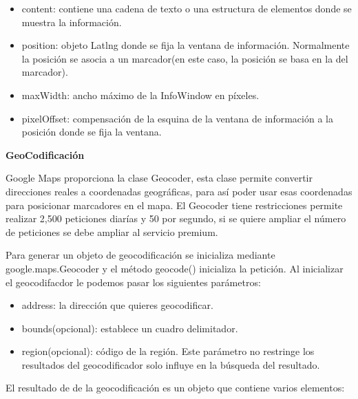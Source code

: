 \begin{itemize}

\item content: contiene una cadena de texto o una estructura de elementos donde se muestra la información.

\item position: objeto Latlng donde se fija la ventana de información. Normalmente la posición se asocia a un marcador(en este caso, la posición se basa en la del marcador).

\item maxWidth: ancho máximo de la InfoWindow en píxeles.

\item pixelOffset: compensación de la esquina de la ventana de información a la posición donde se fija la ventana.

\end{itemize}

\vspace{5 mm}

\textbf{GeoCodificación}

Google Maps proporciona la clase Geocoder, esta clase permite convertir direcciones reales a coordenadas geográficas, para así poder usar esas coordenadas para posicionar marcadores en el mapa. El Geocoder tiene restricciones permite realizar 2,500 peticiones diarías y 50 por segundo, si se quiere ampliar el número de peticiones se debe ampliar al servicio premium.

\vspace{5 mm}

Para generar un objeto de geocodificación se inicializa mediante google.maps.Geocoder y el método geocode() inicializa la petición. Al inicializar el geocodifacdor le podemos pasar los siguientes parámetros:

\begin{itemize}

\item address: la dirección que quieres geocodificar.

\item bounds(opcional): establece un cuadro delimitador. 

\item region(opcional): código de la región. Este parámetro no restringe los resultados del geocodificador solo influye en la búsqueda del resultado.

\end{itemize}

El resultado de de la geocodificación es un objeto que contiene varios elementos: 


